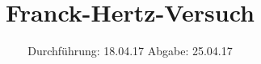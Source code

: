 

\subject{V601}
\title{Franck-Hertz-Versuch}
\date{
  Durchführung: 18.04.17
  \hspace{3em}
  Abgabe: 25.04.17
}



\maketitle
\thispagestyle{empty}
\tableofcontents
\newpage






\printbibliography


